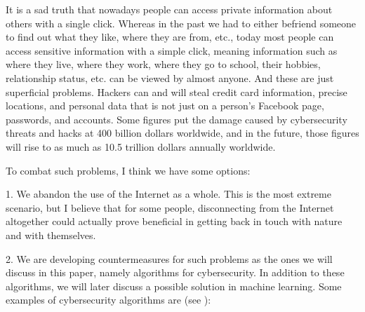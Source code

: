 \documentclass[a4paper,12pt]{report}
\begin{document}
It is a sad truth that nowadays people can access private information about others with a single click. Whereas in the past we had to either befriend someone to find out what they like, where they are from, etc., today most people can access sensitive information with a simple click, meaning information such as where they live, where they work, where they go to school, their hobbies, relationship status, etc. can be viewed by almost anyone. And these are just superficial problems. Hackers can and will steal credit card information, precise locations, and personal data that is not just on a person's Facebook page, passwords, and accounts. Some figures put the damage caused by cybersecurity threats and hacks at 400 billion dollars worldwide, and in the future, those figures will rise to as much as 10.5 trillion dollars annually worldwide.

To combat such problems, I think we have some options:

1. We abandon the use of the Internet as a whole. This is the most extreme scenario, but I believe that for some people, disconnecting from the Internet altogether could actually prove beneficial in getting back in touch with nature and with themselves.

2. We are developing countermeasures for such problems as the ones we will discuss in this paper, namely algorithms for cybersecurity. In addition to these algorithms, we will later discuss a possible solution in machine learning. Some examples of cybersecurity algorithms are (see \cite{Brij}):
\end{document}
